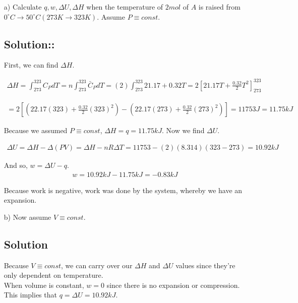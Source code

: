 \documentclass[12pt]{article}
\begin{document}
\begin{itemize}
    \item[a)] Calculate $q,w,\Delta U, \Delta H$ when the temperature of $2 mol$ of $A$ is raised from $0^{\circ}C\rightarrow 50^{\circ}C (273K\rightarrow 323K)$. Assume $P\equiv const$.
    
    \subsection*{Solution::}

    First, we can find $\Delta H$.

    \begin{align*}
        \Delta H=\int_{273}^{323} C_P dT=n\int_{273}^{323}\bar{C}_P dT=(2)\int_{273}^{323} 21.17+0.32T=2\left[21.17T+\frac{0.32}{2}T^2\right]_{273}^{323}
    \end{align*}

    \begin{align*}
        =2\left[\left(22.17(323)+\frac{0.32}{2}(323)^2\right)-\left(22.17(273)+\frac{0.32}{2}(273)^2\right)\right]=11753J=11.75kJ
    \end{align*}

    Because we assumed $P\equiv const$, $\Delta H=q=11.75kJ$. Now we find $\Delta U$.

    \begin{align*}
        \Delta U=\Delta H-\Delta (PV)=\Delta H-nR\Delta T=11753-(2)(8.314)(323-273)=10.92kJ
    \end{align*}

    And so, $w=\Delta U-q$.
    \begin{align*}
        w=10.92kJ-11.75kJ=-0.83kJ
    \end{align*}

    Because work is negative, work was done by the system, whereby we have an expansion.

    \item[b)] Now assume $V\equiv const$.
    
    \subsection*{Solution}

    Because $V\equiv const$, we can carry over our $\Delta H$ and $\Delta U$ values since they're only dependent on temperature.\\When volume is constant, $w=0$ since there is no expansion or compression. This implies that $q=\Delta U=10.92kJ$.

\end{itemize}
\end{document}
